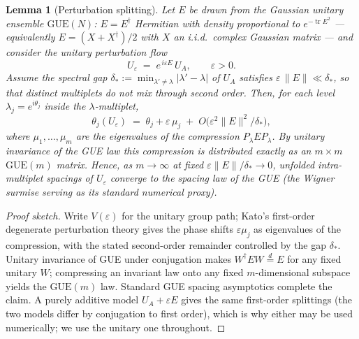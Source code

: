 \documentclass[11pt]{article}
\newtheorem{lemma}[theorem]{Lemma}
\begin{document}
\begin{lemma}[Perturbation splitting]\label{lem:perturb}
Let $E$ be drawn from the Gaussian unitary ensemble $\mathrm{GUE}(N)$:
$E=E^\dagger$ Hermitian with density proportional to
$e^{-\operatorname{tr}E^2}$ --- equivalently $E=(X+X^\dagger)/2$ with
$X$ an i.i.d.\ complex Gaussian matrix --- and consider the
\emph{unitary} perturbation flow
\[
U_\varepsilon \;=\; e^{\,i\varepsilon E}\,U_A ,
\qquad \varepsilon>0 .
\]
Assume the spectral gap
$\delta_\ast:=\min_{\lambda'\ne\lambda}|\lambda'-\lambda|$ of $U_A$
satisfies $\varepsilon\,\|E\|\ll\delta_\ast$, so that distinct
multiplets do not mix through second order. Then, for each level
$\lambda_j=e^{i\theta_j}$ inside the $\lambda$-multiplet,
\[
\theta_j(U_\varepsilon)\;=\;\theta_j+\varepsilon\,\mu_j
\;+\;O\!\bigl(\varepsilon^{2}\|E\|^{2}/\delta_\ast\bigr),
\]
where $\mu_1,\dots,\mu_m$ are the eigenvalues of the compression
$P_\lambda E P_\lambda$. By unitary invariance of the GUE law this
compression is distributed exactly as an $m\times m$
$\mathrm{GUE}(m)$ matrix. Hence, as $m\to\infty$ at fixed
$\varepsilon\|E\|/\delta_\ast\to0$, unfolded intra-multiplet spacings
of $U_\varepsilon$ converge to the spacing law of the GUE (the Wigner
surmise serving as its standard numerical proxy).
\end{lemma}

\begin{proof}[Proof sketch]
Write $V(\varepsilon)$ for the unitary group path; Kato's
first-order degenerate perturbation theory gives the phase shifts
$\varepsilon\mu_j$ as eigenvalues of the compression, with the stated
second-order remainder controlled by the gap $\delta_\ast$.
Unitary invariance of GUE under conjugation makes
$W^\dagger E W\stackrel{d}{=}E$ for any fixed unitary $W$; compressing
an invariant law onto any fixed $m$-dimensional subspace yields the
$\mathrm{GUE}(m)$ law. Standard GUE spacing asymptotics complete the
claim. A purely additive model $U_A+\varepsilon E$ gives the same
first-order splittings (the two models differ by conjugation to first
order), which is why either may be used numerically; we use the
unitary one throughout.
\end{proof}
\end{document}
